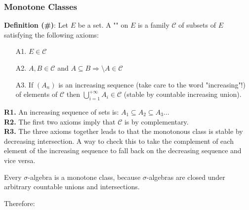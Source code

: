	\pagebreak
	\subsubsection{Monotone Classes}
	\textbf{Definition (\#\mydef)}: Let $E$ be a set. A "" on $E$ is a family $\mathcal{C}$ of subsets of $E$ satisfying the following axioms:
	\begin{enumerate}
		\item[A1.] $E\in \mathcal{C}$
		\item[A2.] $A,B\in \mathcal{C}$ and $A\subseteq B \Rightarrow \setminus A\in \mathcal{C}$
		\item[A3.] If $(A_n)$ is an increasing sequence (take care to the word "increasing"!) of elements of $\mathcal{C}$ then $\displaystyle\bigcup_{i=1}^{+\infty} A_i\in \mathcal{C}$ (stable by countable increasing union).
	\end{enumerate}
	\begin{tcolorbox}[title=Remarks,colframe=black,arc=10pt]
	\textbf{R1.} An increasing sequence of sets is: $A_1\subseteq A_2\subseteq A_3 ...$\\
	
	\textbf{R2.} The first two axioms imply that $\mathcal{C}$ is by complementary.\\
	
	\textbf{R3.} The three axioms together leads to that the monotonous class is stable by decreasing intersection. A way to check this to take the complement of each element of the increasing sequence to fall back on the decreasing sequence and vice versa.
	\end{tcolorbox}
	Every $\sigma$-algebra is a monotone class, because $\sigma$-algebras are closed under arbitrary countable unions and intersections.
	
	Therefore:
	
